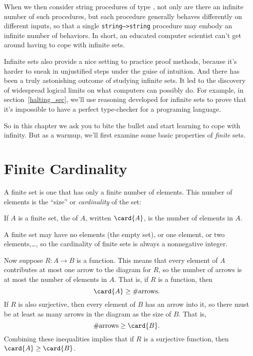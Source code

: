 When we then consider string procedures of type
, not only are there an infinite number
of such procedures, but each procedure generally behaves differently
on different inputs, so that a single \texttt{string-->string}
procedure may embody an infinite number of behaviors.  In short, an
educated computer scientist can't get around having to cope with
infinite sets.  \fi

Infinite sets also provide a nice setting to practice proof methods,
because it's harder to sneak in unjustified steps under the guise of
intuition.  And there has been a truly astonishing outcome of studying
infinite sets.  It led to the discovery of widespread logical limits
on what computers can possibly do.  For example, in
section~\ref{halting_sec}, we'll use reasoning developed for infinite
sets to prove that it's impossible to have a perfect type-checker for
a programing language.

So in this chapter we ask you to bite the bullet and start learning to
cope with infinity.  But as a warmup, we'll first examine some basic
properties of \emph{finite} sets.

\section{Finite Cardinality}\label{mappingrule_sec}

A finite set is one that has only a finite number of elements.  This
number of elements is the ``size'' or \emph{cardinality} of the set:
\begin{definition}\label{fin_card_def}
If $A$ is a finite set, the  of $A$, written
$\card{A}$, is the number of elements in $A$.
\end{definition}
A finite set may have no elements (the empty set), or one element, or
two elements,\dots, so the cardinality of finite sets is always a
nonnegative integer.

Now suppose $R:A \to B$ is a function.  This means that every element
of $A$ contributes at most one arrow to the diagram for $R$, so the
number of arrows is at most the number of elements in $A$.  That is,
if $R$ is a function, then
\[
\card{A} \geq \#\text{arrows}.
\]
If $R$ is also surjective, then every element of $B$ has an arrow into
it, so there must be at least as many arrows in the diagram as the
size of $B$.  That is,
\[
\#\text{arrows} \geq \card{B}.
\]
Combining these inequalities implies that if $R$ is a surjective
function, then $\card{A} \geq \card{B}$.

